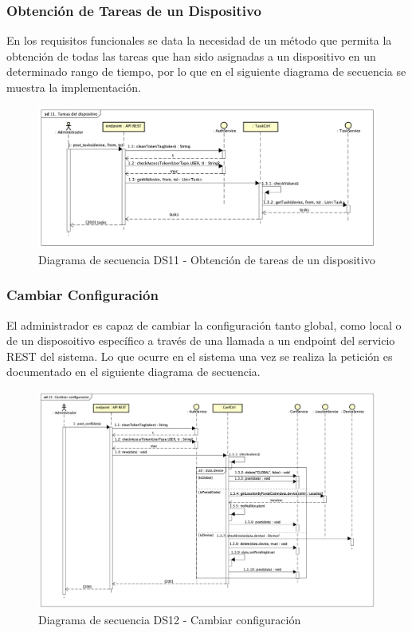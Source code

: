 \subsubsection{Obtención de Tareas de un Dispositivo}

En los requisitos funcionales se data la necesidad de un método que permita la obtención de todas las tareas que han sido asignadas a un dispositivo en un determinado rango de tiempo, por lo que en el siguiente diagrama de secuencia se muestra la implementación.

\begin{figure}[H]
    \centering
    \includegraphics[width=14cm]{./img/sequence/diagram/TareasDeDispositivo.png}
    \caption{Diagrama de secuencia DS11 - Obtención de tareas de un dispositivo}
    \label{fig:seq.getDeviceTasks}
\end{figure}

\newpage
\subsubsection{Cambiar Configuración}

El administrador es capaz de cambiar la configuración tanto global, como local o de un disposoitivo específico a través de una llamada a un endpoint del servicio REST del sistema.
Lo que ocurre en el sistema una vez se realiza la petición es documentado en el siguiente diagrama de secuencia.

\begin{figure}[H]
    \centering
    \includegraphics[width=14cm]{./img/sequence/diagram/CambiarConfiguracion.png}
    \caption{Diagrama de secuencia DS12 - Cambiar configuración}
    \label{fig:seq.ChangeConf}
\end{figure}

